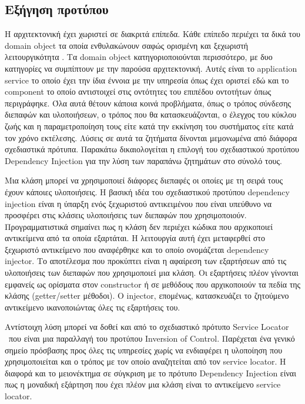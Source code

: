 \subsection{Εξήγηση προτύπου}

Η αρχιτεκτονική έχει χωριστεί σε διακριτά επίπεδα. Κάθε επίπεδο περιέχει 
τα δικά του domain object τα οποία ενθυλακώνουν σαφώς ορισμένη και 
ξεχωριστή λειτουργικότητα \citep{POSA4}. Τα domain object κατηγοριοποιούνται 
περισσότερο, με δυο κατηγορίες να συμπίπτουν με την παρούσα αρχιτεκτονική. 
Αυτές είναι το application service το οποίο έχει την ίδια έννοια με την 
υπηρεσία όπως έχει οριστεί εδώ και το component το οποίο αντιστοιχεί 
στις οντότητες του επιπέδου οντοτήτων όπως περιγράφηκε. Όλα αυτά θέτουν 
κάποια κοινά προβλήματα, όπως ο τρόπος σύνδεσης διεπαφών και 
υλοποιήσεων, ο τρόπος που θα κατασκευάζονται, ο έλεγχος του κύκλου ζωής 
και η παραμετροποίηση τους είτε κατά την εκκίνηση του συστήματος είτε 
κατά τον χρόνο εκτέλεσης. Λύσεις σε αυτά τα ζητήματα δίνονται μεμονωμένα 
από διάφορα σχεδιαστικά πρότυπα. Παρακάτω δικαιολογείται η επιλογή του 
σχεδιαστικού προτύπου Dependency Injection \citep{Fowler2004} για την λύση 
των παραπάνω ζητημάτων στο σύνολό τους.

Μια κλάση μπορεί να χρησιμοποιεί διάφορες διεπαφές οι οποίες με τη σειρά 
τους έχουν κάποιες υλοποιήσεις. Η βασική ιδέα του σχεδιαστικού προτύπου 
dependency injection είναι η ύπαρξη ενός ξεχωριστού αντικειμένου που 
είναι υπεύθυνο να προσφέρει στις κλάσεις υλοποιήσεις των διεπαφών που 
χρησιμοποιούν. Προγραμματιστικά σημαίνει πως η κλάση δεν περιέχει κώδικα 
που αρχικοποιεί αντικείμενα από τα οποία εξαρτάται. Η λειτουργία αυτή 
έχει μεταφερθεί στο ξεχωριστό αντικείμενο που αναφέρθηκε και το οποίο 
ονομάζεται dependency injector. Το αποτέλεσμα που προκύπτει είναι η 
αφαίρεση των εξαρτήσεων από τις υλοποιήσεις των διεπαφών που 
χρησιμοποιεί μια κλάση. Οι εξαρτήσεις πλέον γίνονται εμφανείς ως 
ορίσματα στον constructor ή σε μεθόδους που αρχικοποιούν τα πεδία της 
κλάσης (getter/setter μέθοδοι). Ο injector, επομένως, κατασκευάζει το 
ζητούμενο αντικείμενο ικανοποιώντας όλες τις εξαρτήσεις του.

Αντίστοιχη λύση μπορεί να δοθεί και από το σχεδιαστικό πρότυπο Service 
Locator \citep{dan2003core} που είναι μια παραλλαγή του 
προτύπου Inversion of Control. Παρέχεται ένα γενικό σημείο πρόσβασης 
προς όλες τις υπηρεσίες χωρίς να ενδιαφέρει η υλοποίηση που 
χρησιμοποιείται και ο τρόπος με τον οποίο αναζητείται από τον service 
locator. Η διαφορά και το μειονέκτημα σε σύγκριση με το πρότυπο 
Dependency Injection είναι πως η μοναδική εξάρτηση που έχει πλέον μια 
κλάση είναι το αντικείμενο service locator.

